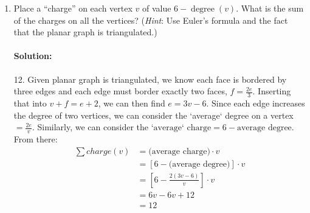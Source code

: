 \documentclass[11pt, notitlepage]{report}
\newenvironment{solution}{\paragraph{Solution:}}{\hfill}
\begin{document}
\begin{enumerate}[label=(\alph*)]
\item Place a ``charge'' on each vertex $v$ of value $6-\operatorname{degree}(v)$. What is
the sum of the charges on all the vertices?
(\textit{Hint}: Use Euler's formula and the fact that the planar graph is
triangulated.)

\begin{solution} 12.
	Given planar graph is triangulated, we know each face is bordered by three edges and each edge must border exactly two faces,  $f=\frac{2e}{3}$. Inserting that into $v+f=e+2$, we can then find $e=3v-6$. Since each edge increases the degree of two vertices, we can consider the `average` degree on a vertex $= \frac{2e}{v}$. Similarly, we can consider the $\text{`average` charge} = 6-\text{average degree}$. From there:
	\begin{align*}
		\sum{charge(v)}&=\text{(average charge)}\cdot v \\
					   &=[6-\text{(average degree)}]\cdot v \\
					   &=[6-\frac{2(3v-6)}{v}]\cdot v \\
					   &=6v-6v+12 \\
					   &=12 \\
	\end{align*}
\end{solution}


\end{enumerate}
\end{document}
